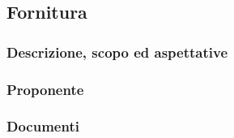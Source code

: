 \subsection{Fornitura}

\subsubsection{Descrizione, scopo ed aspettative}

\subsubsection{Proponente}

\subsubsection{Documenti}



